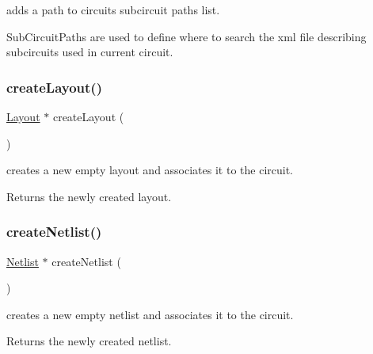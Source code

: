adds a path to circuit\textquotesingle{}s subcircuit paths list. 

Sub\+Circuit\+Paths are used to define where to search the xml file describing subcircuits used in current circuit. \mbox{\label{class_open_chams_1_1_circuit_a725a691b0117c4b913b54e7bfd92832f}} 
\subsubsection{\texorpdfstring{create\+Layout()}{createLayout()}}
{\footnotesize\ttfamily \mbox{\hyperlink{class_open_chams_1_1_layout}{Layout}} $\ast$ create\+Layout (\begin{DoxyParamCaption}{ }\end{DoxyParamCaption})}



creates a new empty layout and associates it to the circuit. 

\begin{DoxyReturn}{Returns}
the newly created layout. 
\end{DoxyReturn}
\mbox{\label{class_open_chams_1_1_circuit_a3f11671c7ea7b4e2cc3487bd7954b667}} 
\subsubsection{\texorpdfstring{create\+Netlist()}{createNetlist()}}
{\footnotesize\ttfamily \mbox{\hyperlink{class_open_chams_1_1_netlist}{Netlist}} $\ast$ create\+Netlist (\begin{DoxyParamCaption}{ }\end{DoxyParamCaption})}



creates a new empty netlist and associates it to the circuit. 

\begin{DoxyReturn}{Returns}
the newly created netlist. 
\end{DoxyReturn}
\mbox{\label{class_open_chams_1_1_circuit_a57a79a9916df4512648bb195decb7250}} 
